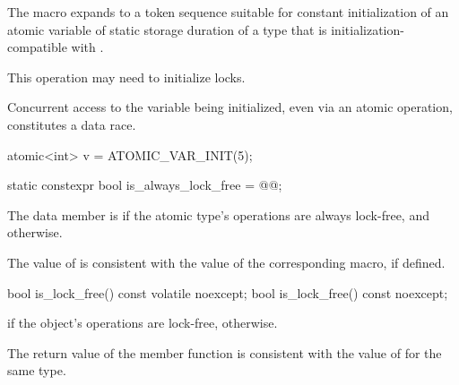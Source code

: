 \begin{itemdescr}
\pnum
The macro expands to a token sequence suitable for
constant initialization of
an atomic variable of static storage duration of a type that is
initialization-compatible with .
\begin{note} This operation may need to initialize locks. \end{note}
Concurrent access to the variable being initialized, even via an atomic operation,
constitutes a data race. \begin{example}
\begin{codeblock}
atomic<int> v = ATOMIC_VAR_INIT(5);
\end{codeblock}
\end{example}
\end{itemdescr}

%
%
%
%
\begin{itemdecl}
static constexpr bool is_always_lock_free = @@;
\end{itemdecl}

\begin{itemdescr}
\pnum
The  data member  is 
if the atomic type's operations are always lock-free, and  otherwise.
\begin{note}
The value of  is consistent with the value of
the corresponding  macro, if defined.
\end{note}
\end{itemdescr}

%
%
%
%
%
\begin{itemdecl}
bool is_lock_free() const volatile noexcept;
bool is_lock_free() const noexcept;
\end{itemdecl}

\begin{itemdescr}
\pnum
\returns {} if the object's operations are lock-free,  otherwise.
\begin{note}
The return value of the  member function
is consistent with the value of  for the same type.
\end{note}
\end{itemdescr}

